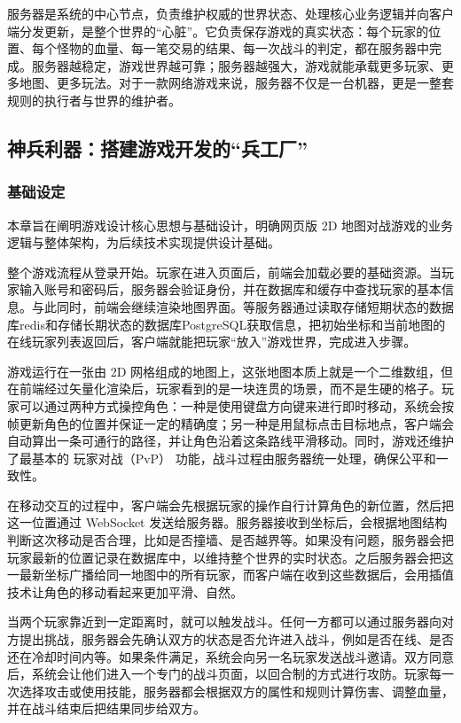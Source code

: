 服务器是系统的中心节点，负责维护权威的世界状态、处理核心业务逻辑并向客户端分发更新，是整个世界的“心脏”。它负责保存游戏的真实状态：每个玩家的位置、每个怪物的血量、每一笔交易的结果、每一次战斗的判定，都在服务器中完成。服务器越稳定，游戏世界越可靠；服务器越强大，游戏就能承载更多玩家、更多地图、更多玩法。对于一款网络游戏来说，服务器不仅是一台机器，更是一整套规则的执行者与世界的维护者。

\subsection{神兵利器：搭建游戏开发的“兵工厂”} %
\subsubsection{基础设定}
本章旨在阐明游戏设计核心思想与基础设计，明确网页版 2D 地图对战游戏的业务逻辑与整体架构，为后续技术实现提供设计基础。

整个游戏流程从登录开始。玩家在进入页面后，前端会加载必要的基础资源。当玩家输入账号和密码后，服务器会验证身份，并在数据库和缓存中查找玩家的基本信息。与此同时，前端会继续渲染地图界面。等服务器通过读取存储短期状态的数据库redis和存储长期状态的数据库PostgreSQL获取信息，把初始坐标和当前地图的在线玩家列表返回后，客户端就能把玩家“放入”游戏世界，完成进入步骤。

游戏运行在一张由 2D 网格组成的地图上，这张地图本质上就是一个二维数组，但在前端经过矢量化渲染后，玩家看到的是一块连贯的场景，而不是生硬的格子。玩家可以通过两种方式操控角色：一种是使用键盘方向键来进行即时移动，系统会按帧更新角色的位置并保证一定的精确度；另一种是用鼠标点击目标地点，客户端会自动算出一条可通行的路径，并让角色沿着这条路线平滑移动。同时，游戏还维护了最基本的 玩家对战（PvP） 功能，战斗过程由服务器统一处理，确保公平和一致性。

在移动交互的过程中，客户端会先根据玩家的操作自行计算角色的新位置，然后把这一位置通过 WebSocket 发送给服务器。服务器接收到坐标后，会根据地图结构判断这次移动是否合理，比如是否撞墙、是否越界等。如果没有问题，服务器会把玩家最新的位置记录在数据库中，以维持整个世界的实时状态。之后服务器会把这一最新坐标广播给同一地图中的所有玩家，而客户端在收到这些数据后，会用插值技术让角色的移动看起来更加平滑、自然。

当两个玩家靠近到一定距离时，就可以触发战斗。任何一方都可以通过服务器向对方提出挑战，服务器会先确认双方的状态是否允许进入战斗，例如是否在线、是否还在冷却时间内等。如果条件满足，系统会向另一名玩家发送战斗邀请。双方同意后，系统会让他们进入一个专门的战斗页面，以回合制的方式进行攻防。玩家每一次选择攻击或使用技能，服务器都会根据双方的属性和规则计算伤害、调整血量，并在战斗结束后把结果同步给双方。

